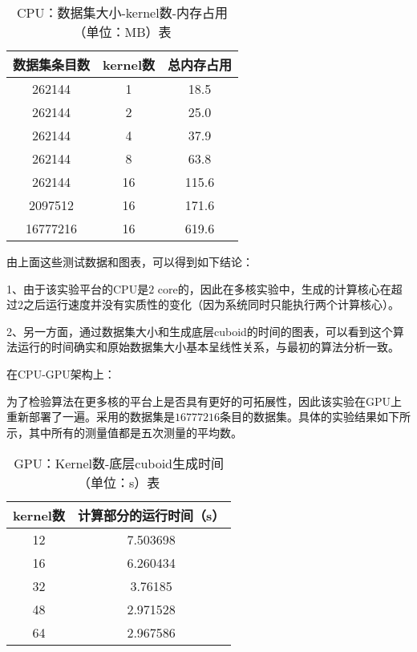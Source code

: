 \begin{table}[htbp]
\centering
\caption{CPU：数据集大小-kernel数-内存占用（单位：MB）表} 
\label{tab:table6}
\begin{tabular}{|c|c|c|}
    \hline
    数据集条目数 & kernel数 & 总内存占用\\
    \hline
    262144 & 1 & 18.5\\
    \hline
    262144 & 2 & 25.0\\
    \hline
    262144 & 4 & 37.9\\
    \hline
    262144 & 8 & 63.8\\
    \hline
    262144 & 16 & 115.6\\
    \hline
    2097512 & 16 & 171.6\\
    \hline
    16777216 & 16 & 619.6\\
    \hline
\end{tabular}
\end{table}

由上面这些测试数据和图表，可以得到如下结论：

1、由于该实验平台的CPU是$2$ core的，因此在多核实验中，生成的计算核心在超过$2$之后运行速度并没有实质性的变化（因为系统同时只能执行两个计算核心）。

2、另一方面，通过数据集大小和生成底层cuboid的时间的图表，可以看到这个算法运行的时间确实和原始数据集大小基本呈线性关系，与最初的算法分析一致。

在CPU-GPU架构上：

为了检验算法在更多核的平台上是否具有更好的可拓展性，因此该实验在GPU上重新部署了一遍。采用的数据集是$16777216$条目的数据集。具体的实验结果如下所示，其中所有的测量值都是五次测量的平均数。

\begin{table}[!htbp]
\centering
\caption{GPU：Kernel数-底层cuboid生成时间（单位：s）表} 
\label{tab:table7}
\begin{tabular}{|c|c|}
    \hline
    kernel数 & 计算部分的运行时间（s）\\
    \hline
    12 & 7.503698\\
    \hline
    16 & 6.260434\\
    \hline
    32 & 3.76185\\
    \hline
    48 & 2.971528\\
    \hline
    64 & 2.967586\\
    \hline
\end{tabular}
\end{table}

